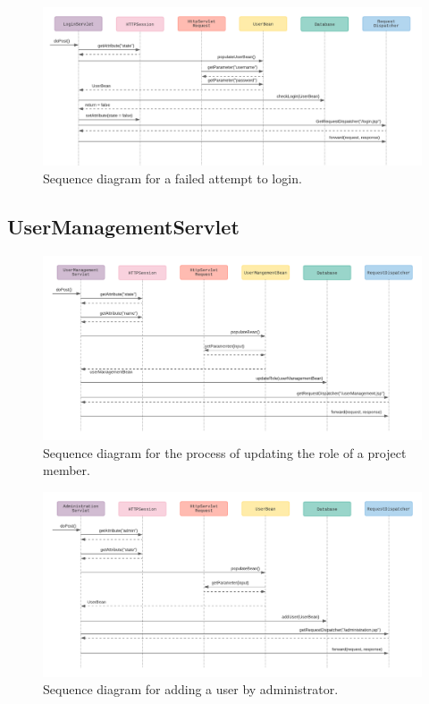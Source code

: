 \documentclass{article}
\begin{document}
\begin{figure}[H]
    \centering
    \includegraphics[scale=0.6]{images/failedLogin.png}
    \caption{Sequence diagram for a failed attempt to login.}
    \label{fig:failedLoginAttempt}
\end{figure}

\pagebreak
\subsection{UserManagementServlet}

\begin{figure}[H]
    \centering
    \includegraphics[scale=0.6]{images/updateRole.png}
    \caption{Sequence diagram for the process of updating the role of a project member.}
    \label{fig:successfulLogin}
\end{figure}

\begin{figure}[H]
    \centering
    \includegraphics[scale=0.6]{images/addUser.png}
    \caption{Sequence diagram for adding a user by administrator.}
    \label{fig:failedLoginAttempt}
\end{figure}
\end{document}
